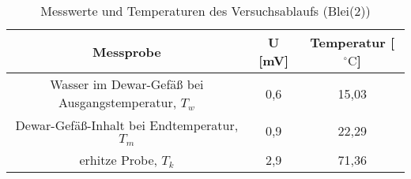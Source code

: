 \begin{table}[h]
	\begin{center}
		\begin{tabular}{ccc}
			Messprobe & U [mV] & Temperatur [$^{\circ}\mathrm{C}$]\\ \hline
			Wasser im Dewar-Gefäß bei Ausgangstemperatur, $T_w$&0,6&15,03\\
			Dewar-Gefäß-Inhalt bei Endtemperatur, $T_m$&0,9&22,29\\
			erhitze Probe, $T_k$&2,9&71,36
		\end{tabular}
		\caption{Messwerte und Temperaturen des Versuchsablaufs (Blei(2))}
		\label{tabblei2}
	\end{center}
\end{table}